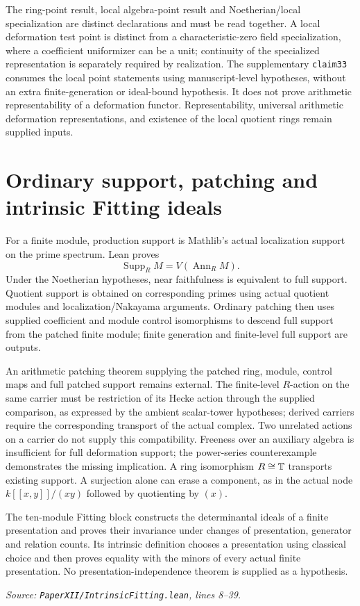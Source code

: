 \documentclass[11pt]{article}
\newcommand{\code}[1]{\nolinkurl{#1}}
\newcommand{\excerpt}[3]{\par\smallskip\textit{Source: \code{PaperXII/#1.lean}, lines #2--#3.}\par\VerbatimInput[fontsize=\scriptsize,breaklines=true,breakanywhere=true,numbers=left,numbersep=4pt,firstline=#2,lastline=#3,firstnumber=#2,frame=lines]{excerpts/#1.display.txt}\par}
\newcommand{\Supp}{\operatorname{Supp}}\newcommand{\Spec}{\operatorname{Spec}}
\newcommand{\Ann}{\operatorname{Ann}}\newcommand{\Fitt}{\operatorname{Fitt}}
\begin{document}
The ring-point result, local algebra-point result and Noetherian/local specialization are distinct declarations and must be read together. A local deformation test point is distinct from a characteristic-zero field specialization, where a coefficient uniformizer can be a unit; continuity of the specialized representation is separately required by realization. The supplementary \code{claim33} consumes the local point statements using manuscript-level hypotheses, without an extra finite-generation or ideal-bound hypothesis. It does not prove arithmetic representability of a deformation functor. Representability, universal arithmetic deformation representations, and existence of the local quotient rings remain supplied inputs.

\section{Ordinary support, patching and intrinsic Fitting ideals}
For a finite module, production support is Mathlib's actual localization support on the prime spectrum. Lean proves
\[
\Supp_R M=V(\Ann_R M).
\]
Under the Noetherian hypotheses, near faithfulness is equivalent to full support. Quotient support is obtained on corresponding primes using actual quotient modules and localization/Nakayama arguments. Ordinary patching then uses supplied coefficient and module control isomorphisms to descend full support from the patched finite module; finite generation and finite-level full support are outputs.

An arithmetic patching theorem supplying the patched ring, module, control maps and full patched support remains external. The finite-level \(R\)-action on the same carrier must be restriction of its Hecke action through the supplied comparison, as expressed by the ambient scalar-tower hypotheses; derived carriers require the corresponding transport of the actual complex. Two unrelated actions on a carrier do not supply this compatibility. Freeness over an auxiliary algebra is insufficient for full deformation support; the power-series counterexample demonstrates the missing implication. A ring isomorphism \(R\cong\mathbb T\) transports existing support. A surjection alone can erase a component, as in the actual node \(k[[x,y]]/(xy)\) followed by quotienting by \((x)\).

The ten-module Fitting block constructs the determinantal ideals of a finite presentation and proves their invariance under changes of presentation, generator and relation counts. Its intrinsic definition chooses a presentation using classical choice and then proves equality with the minors of every actual finite presentation. No presentation-independence theorem is supplied as a hypothesis.
\excerpt{IntrinsicFitting}{8}{39}
\end{document}
